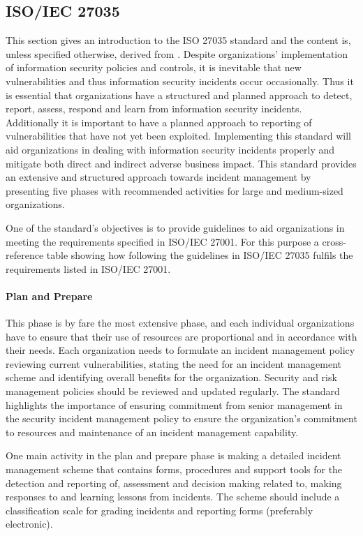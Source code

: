 \subsection{\acs{ISO}/\acs{IEC} 27035}
This section gives an introduction to the ISO 27035 standard and the content is, unless specified otherwise, derived from \cite{ISO/IEC27035}. Despite organizations' implementation of information security policies and controls, it is inevitable that new vulnerabilities and thus information security incidents occur occasionally. Thus it is essential that organizations have a structured and planned approach to detect, report, assess, respond and learn from information security incidents. Additionally it is important to have a planned approach to reporting of vulnerabilities that have not yet been exploited. Implementing this standard will aid organizations in dealing with information security incidents properly and mitigate both direct and indirect adverse business impact. This standard provides an extensive and structured approach towards incident management by presenting five phases with recommended activities for large and medium-sized organizations. 

One of the standard's objectives is to provide guidelines to aid organizations in meeting the requirements specified in ISO/IEC 27001. For this purpose a cross-reference table showing how following the guidelines in ISO/IEC 27035 fulfils the requirements listed in ISO/IEC 27001.

\paragraph{Plan and Prepare} This phase is by fare the most extensive phase, and each individual organizations have to ensure that their use of resources are proportional and in accordance with their needs. Each organization needs to formulate an incident management policy reviewing current vulnerabilities, stating the need for an incident management scheme and identifying overall benefits for the organization. Security and risk management policies should be reviewed and updated regularly. The standard highlights the importance of ensuring commitment from senior management in the security incident management policy to ensure the organization's commitment to resources and maintenance of an incident management capability.  

One main activity in the plan and prepare phase is making a detailed incident management scheme that contains forms, procedures and support tools for the detection and reporting of, assessment and decision making related to, making responses to and learning lessons from incidents. The scheme should include a classification scale for grading incidents and reporting forms (preferably electronic).   

